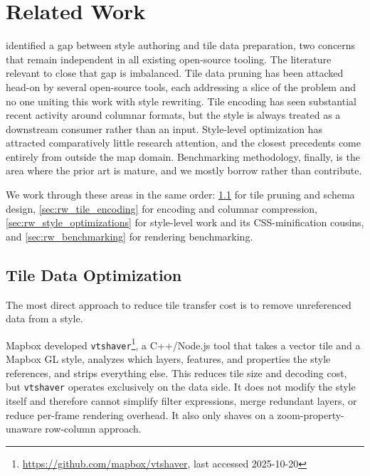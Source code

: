 \chapter{Related Work}\label{ch:related_work}

 identified a gap between style authoring and tile data preparation, two concerns that remain independent in all existing open-source tooling.
The literature relevant to close that gap is imbalanced.
Tile data pruning has been attacked head-on by several open-source tools, each addressing a slice of the problem and no one uniting this work with style rewriting.
Tile encoding has seen substantial recent activity around columnar formats, but the style is always treated as a downstream consumer rather than an input.
Style-level optimization has attracted comparatively little research attention, and the closest precedents come entirely from outside the map domain.
Benchmarking methodology, finally, is the area where the prior art is mature, and we mostly borrow rather than contribute.

We work through these areas in the same order:
\cref{sec:rw_tile_data} for tile pruning and schema design,
\cref{sec:rw_tile_encoding} for encoding and columnar compression,
\cref{sec:rw_style_optimizations} for style-level work and its \ac{CSS}-minification cousins,
and \cref{sec:rw_benchmarking} for rendering benchmarking.

\section{Tile Data Optimization}\label{sec:rw_tile_data}

The most direct approach to reduce tile transfer cost is to remove unreferenced data from a style.

Mapbox developed \texttt{vtshaver}\footnote{\url{https://github.com/mapbox/vtshaver}, last accessed 2025-10-20}, a C++/Node.js tool that takes a vector tile and a Mapbox GL style, analyzes which layers, features, and properties the style references, and strips everything else.
This reduces tile size and decoding cost, but \texttt{vtshaver} operates exclusively on the data side.
It does not modify the style itself and therefore cannot simplify filter expressions, merge redundant layers, or reduce per-frame rendering overhead.
It also only shaves on a zoom-property-unaware row-column approach.

